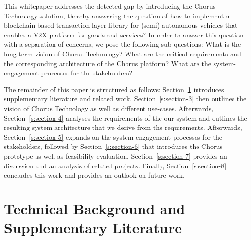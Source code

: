 \documentclass{llncs}
\begin{document}
{%





		This whitepaper addresses the detected gap by introducing the Chorus Technology solution, thereby answering the question of how to implement a blockchain-based transaction layer library for (semi)-autonomous vehicles that enables a V2X platform for goods and services? In order to answer this question with a separation of concerns, we pose the following sub-questions: What is the long term vision of Chorus Technology? What are the critical requirements and the corresponding architecture of the Chorus platform? What are the system-engagement processes for the stakeholders?

		The remainder of this paper is structured as follows: Section~\ref{s:section-2} introduces supplementary literature and related work. Section~\ref{s:section-3} then outlines the vision of Chorus Technology as well as different use-cases. Afterwards, Section~\ref{s:section-4} analyses the requirements of the our system and outlines the resulting system architecture that we derive from the requirements. Afterwards, Section~\ref{s:section-5} expands on the system-engagement processes for the stakeholders, followed by Section~\ref{s:section-6} that introduces the Chorus prototype as well as feasibility evaluation. Section~\ref{s:section-7} provides an discussion and an analysis of related projects. Finally, Section~\ref{s:section-8} concludes this work and provides an outlook on future work.



	\section{Technical Background and Supplementary Literature}	
		\label{s:section-2}
		
}
\end{document}
